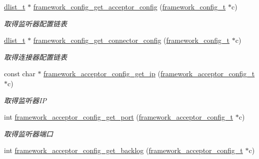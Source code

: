 \begin{DoxyCompactItemize}
\hyperlink{a00050_ad6644d67df4b4e3596c1eb12977d1d16_ad6644d67df4b4e3596c1eb12977d1d16}{dlist\+\_\+t} $\ast$ \hyperlink{a00054_a83bfc56ba855d7e63fe8d02826925873_a83bfc56ba855d7e63fe8d02826925873}{framework\+\_\+config\+\_\+get\+\_\+acceptor\+\_\+config} (\hyperlink{a00050_a55b26efa9e6ee05514d087ba2593a54b_a55b26efa9e6ee05514d087ba2593a54b}{framework\+\_\+config\+\_\+t} $\ast$c)
\begin{DoxyCompactList}\small\item\em 取得监听器配置链表 \end{DoxyCompactList}\item 
\hyperlink{a00050_ad6644d67df4b4e3596c1eb12977d1d16_ad6644d67df4b4e3596c1eb12977d1d16}{dlist\+\_\+t} $\ast$ \hyperlink{a00054_ad6f3bd205eb112864ad9a26755e274af_ad6f3bd205eb112864ad9a26755e274af}{framework\+\_\+config\+\_\+get\+\_\+connector\+\_\+config} (\hyperlink{a00050_a55b26efa9e6ee05514d087ba2593a54b_a55b26efa9e6ee05514d087ba2593a54b}{framework\+\_\+config\+\_\+t} $\ast$c)
\begin{DoxyCompactList}\small\item\em 取得连接器配置链表 \end{DoxyCompactList}\item 
const char $\ast$ \hyperlink{a00054_a699a67643020ce0635b263ca82ba99bc_a699a67643020ce0635b263ca82ba99bc}{framework\+\_\+acceptor\+\_\+config\+\_\+get\+\_\+ip} (\hyperlink{a00050_a61a4e424ff4c86631423dedd97c40064_a61a4e424ff4c86631423dedd97c40064}{framework\+\_\+acceptor\+\_\+config\+\_\+t} $\ast$c)
\begin{DoxyCompactList}\small\item\em 取得监听器\+I\+P \end{DoxyCompactList}\item 
int \hyperlink{a00054_a438a9582850ffc05337892630cfdb3c7_a438a9582850ffc05337892630cfdb3c7}{framework\+\_\+acceptor\+\_\+config\+\_\+get\+\_\+port} (\hyperlink{a00050_a61a4e424ff4c86631423dedd97c40064_a61a4e424ff4c86631423dedd97c40064}{framework\+\_\+acceptor\+\_\+config\+\_\+t} $\ast$c)
\begin{DoxyCompactList}\small\item\em 取得监听器端口 \end{DoxyCompactList}\item 
int \hyperlink{a00054_a448d720795e0814e071d8d2212bd8af7_a448d720795e0814e071d8d2212bd8af7}{framework\+\_\+acceptor\+\_\+config\+\_\+get\+\_\+backlog} (\hyperlink{a00050_a61a4e424ff4c86631423dedd97c40064_a61a4e424ff4c86631423dedd97c40064}{framework\+\_\+acceptor\+\_\+config\+\_\+t} $\ast$c)

\end{DoxyCompactItemize}
